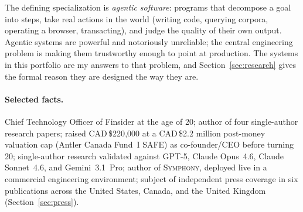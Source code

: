 \documentclass[11pt]{article}
\theoremstyle{plain}
\theoremstyle{definition}
\begin{document}
The defining specialization is \emph{agentic software}: programs that decompose a goal
into steps, take real actions in the world (writing code, querying corpora, operating a
browser, transacting), and judge the quality of their own output. Agentic systems are
powerful and notoriously unreliable; the central engineering problem is making them
trustworthy enough to point at production. The systems in this portfolio are my answers to
that problem, and Section~\ref{sec:research} gives the formal reason they are designed the
way they are.

\paragraph{Selected facts.}
Chief Technology Officer of Finsider at the age of 20; author of
four single-author research papers; raised
CAD\,\$220{,}000 at a CAD\,\$2.2 million post-money valuation cap (Antler Canada Fund~I SAFE) as co-founder/CEO before
turning 20; single-author research validated against GPT-5, Claude Opus~4.6, Claude
Sonnet~4.6, and Gemini~3.1~Pro; author of \textsc{Symphony}, deployed live in a commercial
engineering environment; subject of independent press coverage in six publications across
the United States, Canada, and the United Kingdom (Section~\ref{sec:press}).

\end{document}
